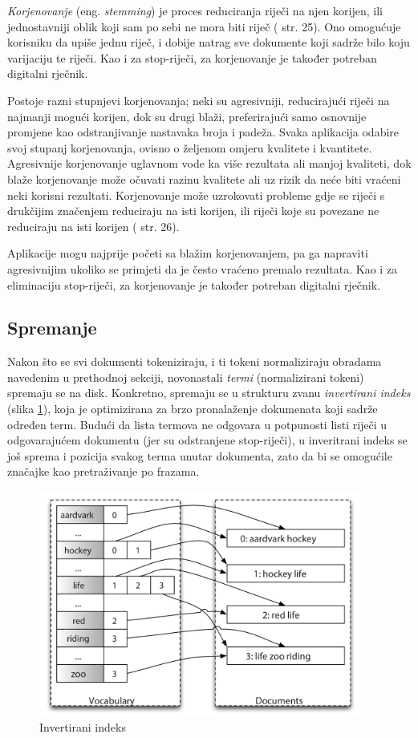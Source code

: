 \documentclass[a4paper,twoside,12pt]{scrreprt}
\begin{document}
\textit{Korjenovanje} (eng. \textit{stemming}) je proces reduciranja riječi na njen korijen, ili jednostavniji oblik koji sam po sebi ne mora biti riječ (\cite{taming} str. 25). Ono omogućuje korisniku da upiše jednu riječ, i dobije natrag sve dokumente koji sadrže bilo koju varijaciju te riječi. Kao i za stop-riječi, za korjenovanje je također potreban digitalni rječnik.

Postoje razni stupnjevi korjenovanja; neki su agresivniji, reducirajući riječi na najmanji mogući korijen, dok su drugi blaži, preferirajući samo osnovnije promjene kao odstranjivanje nastavaka broja i padeža. Svaka aplikacija odabire svoj stupanj korjenovanja, ovisno o željenom omjeru kvalitete i kvantitete. Agresivnije korjenovanje uglavnom vode ka više rezultata ali manjoj kvaliteti, dok blaže korjenovanje može očuvati razinu kvalitete ali uz rizik da neće biti vraćeni neki korisni rezultati. Korjenovanje može uzrokovati probleme gdje se riječi s drukčijim značenjem reduciraju na isti korijen, ili riječi koje su povezane ne reduciraju na isti korijen (\cite{taming} str. 26).

Aplikacije mogu najprije početi sa blažim korjenovanjem, pa ga napraviti agresivnijim ukoliko se primjeti da je često vraćeno premalo rezultata. Kao i za eliminaciju stop-riječi, za korjenovanje je također potreban digitalni rječnik.

\subsection{Spremanje}

Nakon što se svi dokumenti tokeniziraju, i ti tokeni normaliziraju obradama navedenim u prethodnoj sekciji, novonastali \textit{termi} (normalizirani tokeni) spremaju se na disk. Konkretno, spremaju se u strukturu zvanu \textit{invertirani indeks} (slika \ref{inverted_index}), koja je optimizirana za brzo pronalaženje dokumenata koji sadrže određen term. Budući da lista termova ne odgovara u potpunosti listi riječi u odgovarajućem dokumentu (jer su odstranjene stop-riječi), u inveritrani indeks se još sprema i pozicija svakog terma unutar dokumenta, zato da bi se omogućile značajke kao pretraživanje po frazama.

\begin{figure}[H]
  \centering
  \includegraphics[width=300pt]{inverted_index}
  \caption{Invertirani indeks}
  \label{inverted_index}
\end{figure}
\end{document}
